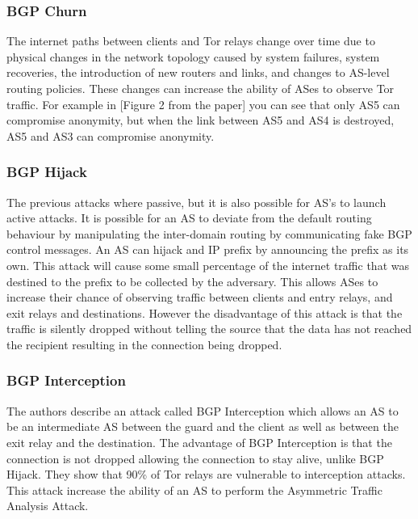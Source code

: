 \documentclass[9pt,technote]{IEEEtran}
\begin{document}
\subsubsection{BGP Churn}
The internet paths between clients and Tor relays change over time due to
physical changes in the network topology caused by system failures, system
recoveries, the introduction of new routers and links, and changes to AS-level
routing policies. These changes can increase the ability of ASes to observe Tor
traffic. For example in [Figure 2 from the paper] you can see that only AS5 can
compromise anonymity, but when the link between AS5 and AS4 is destroyed, AS5
and AS3 can compromise anonymity.
\subsubsection{BGP Hijack}
The previous attacks where passive, but it is also possible for AS's to launch
active attacks. It is possible for an AS to deviate from the default routing
behaviour by manipulating the inter-domain routing by communicating fake BGP
control messages. An AS can hijack and IP prefix by announcing the prefix as its
own. This attack will cause some small percentage of the internet traffic that
was destined to the prefix to be collected by the adversary. This allows ASes to
increase their chance of observing traffic between clients and entry relays, and
exit relays and destinations. However the disadvantage of this attack is that
the traffic is silently dropped without telling the source that the data has not
reached the recipient resulting in the connection being dropped.
\subsubsection{BGP Interception}
The authors describe an attack called BGP Interception which allows an AS to be
an intermediate AS between the guard and the client as well as between the exit
relay and the destination. The advantage of BGP Interception is that the
connection is not dropped allowing the connection to stay alive, unlike BGP
Hijack. They show that 90\% of Tor relays are vulnerable to interception
attacks. This attack increase the ability of an AS to perform the Asymmetric
Traffic Analysis Attack. 
\end{document}
